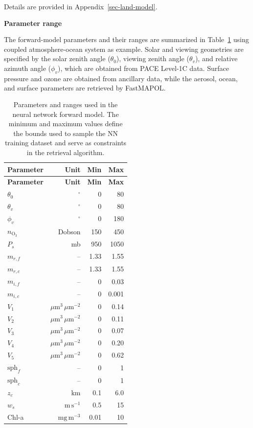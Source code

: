 \documentclass[
  11pt,
  letterpaper,
]{scrreprt}
\begin{document}
Details are provided in Appendix~\ref{sec-land-model}.

\textbf{Parameter range}

The forward-model parameters and their ranges are summarized in
Table~\ref{tbl-param-ranges} using coupled atmosphere-ocean system as
example. Solar and viewing geometries are specified by the solar zenith
angle (\(\theta_0\)), viewing zenith angle (\(\theta_v\)), and relative
azimuth angle (\(\phi_v\)), which are obtained from PACE Level-1C data.
Surface pressure and ozone are obtained from ancillary data, while the
aerosol, ocean, and surface parameters are retrieved by FastMAPOL.

\begin{longtable}[]{@{}lrrr@{}}
\caption{Parameters and ranges used in the neural network forward model.
The minimum and maximum values define the bounds used to sample the NN
training dataset and serve as constraints in the retrieval
algorithm.}\label{tbl-param-ranges}\tabularnewline
\toprule\noalign{}
\textbf{Parameter} & \textbf{Unit} & \textbf{Min} & \textbf{Max} \\
\midrule\noalign{}
\endfirsthead
\toprule\noalign{}
\textbf{Parameter} & \textbf{Unit} & \textbf{Min} & \textbf{Max} \\
\midrule\noalign{}
\endhead
\bottomrule\noalign{}
\endlastfoot
\(\theta_0\) & \(^\circ\) & 0 & 80 \\
\(\theta_v\) & \(^\circ\) & 0 & 80 \\
\(\phi_v\) & \(^\circ\) & 0 & 180 \\
\(n_{\mathrm{O}_3}\) & Dobson & 150 & 450 \\
\(P_s\) & mb & 950 & 1050 \\
\(m_{r,f}\) & -- & 1.33 & 1.55 \\
\(m_{r,c}\) & -- & 1.33 & 1.55 \\
\(m_{i,f}\) & -- & 0 & 0.03 \\
\(m_{i,c}\) & -- & 0 & 0.001 \\
\(V_1\) & \(\mu\mathrm{m}^3\,\mu\mathrm{m}^{-2}\) & 0 & 0.14 \\
\(V_2\) & \(\mu\mathrm{m}^3\,\mu\mathrm{m}^{-2}\) & 0 & 0.11 \\
\(V_3\) & \(\mu\mathrm{m}^3\,\mu\mathrm{m}^{-2}\) & 0 & 0.07 \\
\(V_4\) & \(\mu\mathrm{m}^3\,\mu\mathrm{m}^{-2}\) & 0 & 0.20 \\
\(V_5\) & \(\mu\mathrm{m}^3\,\mu\mathrm{m}^{-2}\) & 0 & 0.62 \\
\(\mathrm{sph}_f\) & -- & 0 & 1 \\
\(\mathrm{sph}_c\) & -- & 0 & 1 \\
\(z_c\) & km & 0.1 & 6.0 \\
\(w_s\) & \(\mathrm{m}\,\mathrm{s}^{-1}\) & 0.5 & 15 \\
Chl-a & \(\mathrm{mg}\,\mathrm{m}^{-3}\) & 0.01 & 10 \\
\end{longtable}
\end{document}
